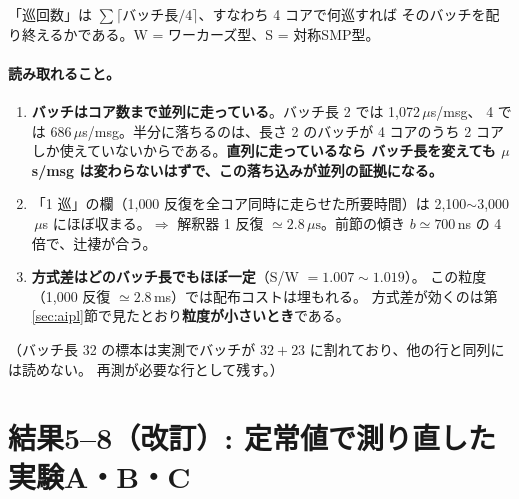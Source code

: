 \documentclass[a4paper,11pt]{ltjsarticle}
\begin{document}
\noindent
「巡回数」は $\sum \lceil \text{バッチ長}/4 \rceil$、すなわち 4 コアで何巡すれば
そのバッチを配り終えるかである。W = ワーカーズ型、S = 対称SMP型。

\begin{center}
\end{center}

\paragraph{読み取れること。}
\begin{enumerate}
\item \textbf{バッチはコア数まで並列に走っている}。バッチ長 2 では 1{,}072$\,\mu$s/msg、
      4 では 686$\,\mu$s/msg。半分に落ちるのは、長さ 2 のバッチが 4 コアのうち
      2 コアしか使えていないからである。\textbf{直列に走っているなら
      バッチ長を変えても $\mu$s/msg は変わらないはずで、この落ち込みが並列の証拠になる。}
\item 「1 巡」の欄（1{,}000 反復を全コア同時に走らせた所要時間）は
      2{,}100$\sim$3{,}000$\,\mu$s にほぼ収まる。$\Rightarrow$ 解釈器 1 反復
      $\simeq 2.8\,\mu\mathrm{s}$。前節の傾き $b\simeq 700\,$ns の 4 倍で、辻褄が合う。
\item \textbf{方式差はどのバッチ長でもほぼ一定}（S/W $= 1.007\sim1.019$）。
      この粒度（1{,}000 反復 $\simeq 2.8\,$ms）では配布コストは埋もれる。
      方式差が効くのは第\ref{sec:aipl}節で見たとおり\textbf{粒度が小さいとき}である。
\end{enumerate}

\noindent
（バッチ長 32 の標本は実測でバッチが $32+23$ に割れており、他の行と同列には読めない。
再測が必要な行として残す。）

\section{結果5--8（改訂）: 定常値で測り直した実験A・B・C}\label{sec:abc}
\end{document}
